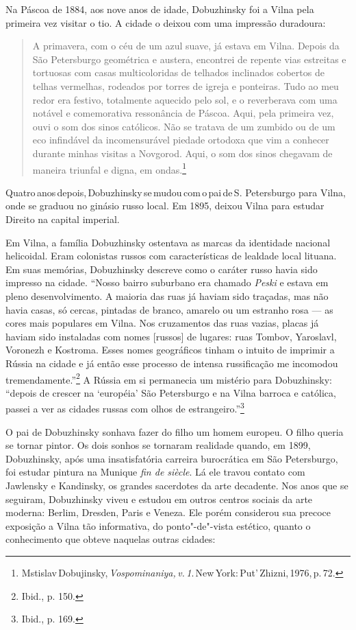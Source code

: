 Na Páscoa de 1884, aos nove anos de idade, Dobuzhinsky foi a Vilna pela
primeira vez visitar o tio. A cidade o deixou com uma impressão
duradoura:

\begin{quote}
A primavera, com o céu de um azul suave, já estava em Vilna. Depois da
São Petersburgo geométrica e austera, encontrei de repente vias
estreitas e tortuosas com casas multicoloridas de telhados inclinados
cobertos de telhas vermelhas, rodeados por torres de igreja e ponteiras.
Tudo ao meu redor era festivo, totalmente aquecido pelo sol, e o
reverberava com uma notável e comemorativa ressonância de Páscoa. Aqui,
pela primeira vez, ouvi o som dos sinos católicos. Não se tratava de um
zumbido ou de um eco infindável da incomensurável piedade ortodoxa que
vim a conhecer durante minhas visitas a Novgorod. Aqui, o som dos sinos
chegavam de maneira triunfal e digna, em ondas.\footnote{Mstislav\,Dobujinsky,\,\emph{Vospominaniya,\,v.\,1}.\,New\,York:\,Put'\,Zhizni,\,1976,\,p.\,72.}
\end{quote}


Quatro\,anos\,depois,\,Dobuzhinsky\,se\,mudou\,com\,o\,pai\,de\,S. Petersburgo %
para Vilna, onde se graduou no ginásio russo local. Em 1895, deixou
Vilna para estudar Direito na capital imperial.

Em Vilna, a família Dobuzhinsky ostentava as marcas da identidade
nacional helicoidal. Eram colonistas russos com características de
lealdade local lituana. Em suas memórias, Dobuzhinsky descreve como o
caráter russo havia sido impresso na cidade. ``Nosso bairro suburbano
era chamado \emph{Peski} e estava em pleno desenvolvimento. A maioria
das ruas já haviam sido traçadas, mas não havia casas, só cercas,
pintadas de branco, amarelo ou um estranho rosa --- as cores mais
populares em Vilna. Nos cruzamentos das ruas vazias, placas já haviam
sido instaladas com nomes {[}russos{]} de lugares: ruas Tombov,
Yaroslavl, Voronezh e Kostroma. Esses nomes geográficos tinham o intuito
de imprimir a Rússia na cidade e já então esse processo de intensa
russificação me incomodou tremendamente.''\footnote{Ibid., p. 150.} A
Rússia em si permanecia um mistério para Dobuzhinsky: ``depois de
crescer na `européia' São Petersburgo e na Vilna barroca e católica,
passei a ver as cidades russas com olhos de estrangeiro.''\footnote{Ibid.,
  p. 169.}

O pai de Dobuzhinsky sonhava fazer do filho um homem europeu. O filho
queria se tornar pintor. Os dois sonhos se tornaram realidade quando, em
1899, Dobuzhinsky, após uma insatisfatória carreira burocrática em São
Petersburgo, foi estudar pintura na Munique \emph{fin de siècle}. Lá ele
travou contato com Jawlensky e Kandinsky, os grandes sacerdotes da arte
decadente. Nos anos que se seguiram, Dobuzhinsky viveu e estudou em
outros centros sociais da arte moderna: Berlim, Dresden, Paris e Veneza.
Ele porém considerou sua precoce exposição a Vilna tão informativa, do
ponto"-de"-vista estético, quanto o conhecimento que obteve naquelas
outras cidades:

